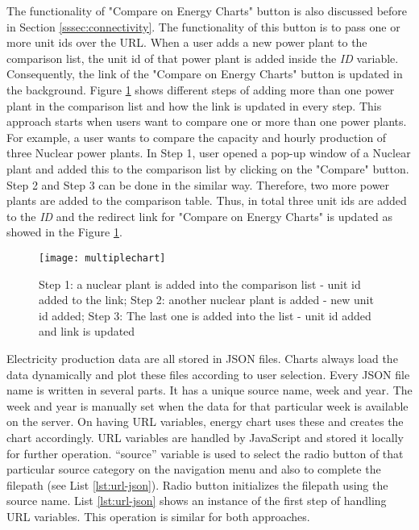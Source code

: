 The functionality of "Compare on Energy Charts" button is also discussed before in Section \ref{sssec:connectivity}. The functionality of this button is to pass one or more unit ids over the URL. When a user adds a new power plant to the comparison list, the unit id of that power plant is added inside the \textit{ID} variable. Consequently, the link of the "Compare on Energy Charts" button is updated in the background. Figure \ref{fig:stepsPP} shows different steps of adding more than one power plant in the comparison list and how the link is updated in every step. This approach starts when users want to compare one or more than one power plants. For example, a user wants to compare the capacity and hourly production of three Nuclear power plants. In Step 1, user opened a pop-up window of a Nuclear plant and added this to the comparison list by clicking on the "Compare" button. Step 2 and Step 3 can be done in the similar way. Therefore, two more power plants are added to the comparison table. Thus, in total three unit ids are added to the \textit{ID} and the redirect link for "Compare on Energy Charts" is updated as showed in the Figure \ref{fig:stepsPP}. 

\begin{figure} [H]
\centering
\texttt{[image: multiplechart]}
\caption[Steps of adding power plants to the comparison list]{Step 1: a nuclear plant is added into the comparison list - unit id added to the link; Step 2: another nuclear plant is added - new unit id added; Step 3: The last one is added into the list - unit id added and link is updated}
\label{fig:stepsPP}
\end{figure}

Electricity production data are all stored in JSON files. Charts always load the data dynamically and plot these files according to user selection. Every JSON file name is written in several parts. It has a unique source name, week and year. The week and year is manually set when the data for that particular week is available on the server. On having URL variables, energy chart uses these and creates the chart accordingly. URL variables are handled by JavaScript and stored it locally for further operation. “source” variable is used to select the radio button of that particular source category on the navigation menu and also to complete the filepath (see List \ref{lst:url-json}). Radio button initializes the filepath using the source name. List \ref{lst:url-json} shows an instance of the first step of handling URL variables. This operation is similar for both approaches. 

